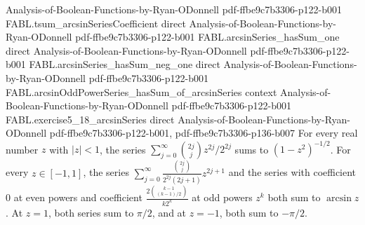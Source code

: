 \begin{theorem}
  {Analysis-of-Boolean-Functions-by-Ryan-ODonnell}
  {pdf-ffbe9c7b3306-p122-b001}
\proofstep
  {FABL.tsum_arcsinSeriesCoefficient}
  {direct}
  {Analysis-of-Boolean-Functions-by-Ryan-ODonnell}
  {pdf-ffbe9c7b3306-p122-b001}
\proofstep
  {FABL.arcsinSeries_hasSum_one}
  {direct}
  {Analysis-of-Boolean-Functions-by-Ryan-ODonnell}
  {pdf-ffbe9c7b3306-p122-b001}
\proofstep
  {FABL.arcsinSeries_hasSum_neg_one}
  {direct}
  {Analysis-of-Boolean-Functions-by-Ryan-ODonnell}
  {pdf-ffbe9c7b3306-p122-b001}
\proofstep
  {FABL.arcsinOddPowerSeries_hasSum_of_arcsinSeries}
  {context}
  {Analysis-of-Boolean-Functions-by-Ryan-ODonnell}
  {pdf-ffbe9c7b3306-p122-b001}
\proofstep
  {FABL.exercise5_18_arcsinSeries}
  {direct}
  {Analysis-of-Boolean-Functions-by-Ryan-ODonnell}
  {pdf-ffbe9c7b3306-p122-b001,
    pdf-ffbe9c7b3306-p136-b007}
For every real number $z$ with $|z|<1$, the series
$\sum_{j=0}^{\infty}\binom{2j}{j}z^{2j}/2^{2j}$ sums to $(1-z^2)^{-1/2}$. For every
$z\in[-1,1]$, the series $\sum_{j=0}^{\infty}\frac{\binom{2j}{j}}{2^{2j}(2j+1)}z^{2j+1}$
and the series with coefficient $0$ at even powers and coefficient
$\frac{2\binom{k-1}{(k-1)/2}}{k2^k}$ at odd powers $z^k$ both sum to $\arcsin z$. At
$z=1$, both series sum to $\pi/2$, and at $z=-1$, both sum to $-\pi/2$.
\end{theorem}
